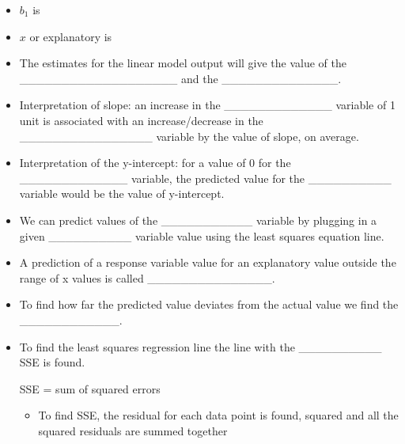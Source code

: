 \documentclass[
]{report}
\providecommand{\tightlist}{%
  \setlength{\itemsep}{0pt}\setlength{\parskip}{0pt}}
\begin{document}
\vspace{0.1in}

\begin{itemize}
\tightlist
\item
  \(b_1\) is
\end{itemize}

\vspace{0.1in}

\begin{itemize}
\tightlist
\item
  \(x\) or explanatory is
\end{itemize}

\vspace{0.1in}


\begin{itemize}
\item
  The estimates for the linear model output will give the value of the \_\_\_\_\_\_\_\_\_\_\_\_\_\_\_\_\_\_\_ and the \_\_\_\_\_\_\_\_\_\_\_\_\_\_.
\item
  Interpretation of slope: an increase in the \_\_\_\_\_\_\_\_\_\_\_\_\_ variable of 1 unit is associated with an increase/decrease in the \_\_\_\_\_\_\_\_\_\_\_\_\_\_\_\_ variable by the value of slope, on average.
\item
  Interpretation of the y-intercept: for a value of 0 for the \_\_\_\_\_\_\_\_\_\_\_\_\_ variable, the predicted value for the \_\_\_\_\_\_\_\_\_\_ variable would be the value of y-intercept.
\item
  We can predict values of the \_\_\_\_\_\_\_\_\_\_\_ variable by plugging in a given \_\_\_\_\_\_\_\_\_\_ variable value using the least squares equation line.
\item
  A prediction of a response variable value for an explanatory value outside the range of x values is called \_\_\_\_\_\_\_\_\_\_\_\_\_\_\_.
\item
  To find how far the predicted value deviates from the actual value we find the \_\_\_\_\_\_\_\_\_\_\_\_.
\end{itemize}

\vspace{0.3in}

\begin{itemize}
\item
  To find the least squares regression line the line with the \_\_\_\_\_\_\_\_\_\_ SSE is found.

  SSE = sum of squared errors

  \begin{itemize}
  \tightlist
  \item
    To find SSE, the residual for each data point is found, squared and all the squared residuals are summed together
  \end{itemize}
\end{itemize}
\end{document}

